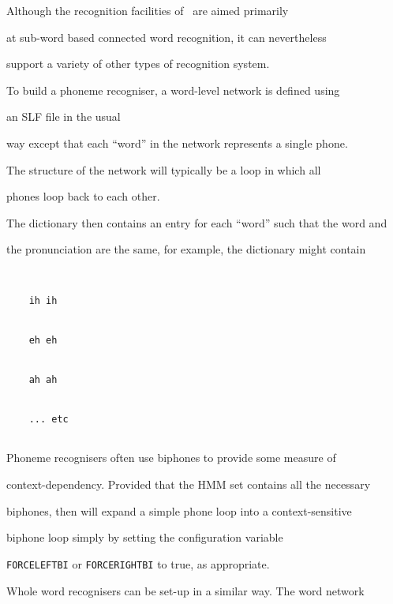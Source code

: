 




Although the recognition facilities of \HTK\ are aimed primarily


at sub-word based connected word recognition, it can nevertheless


support a variety of other types of recognition system.





To build a phoneme recogniser, a word-level network is defined using


an SLF file in the usual


way except that each ``word'' in the network represents a single phone.


The structure of the network will typically be a loop in which all


phones loop back to each other.





The dictionary then contains an entry for each ``word'' such that the word and


the pronunciation are the same, for example, the dictionary might contain


\begin{verbatim}


    ih ih


    eh eh


    ah ah


    ... etc


\end{verbatim}





Phoneme recognisers often use biphones to provide some measure of


context-dependency.  Provided that the HMM set contains all the necessary


biphones, then  will expand a simple phone loop into a context-sensitive


biphone loop simply by setting the configuration variable 


\texttt{FORCELEFTBI} or \texttt{FORCERIGHTBI} to true, as appropriate.





Whole word recognisers can be set-up in a similar way.  The word network


